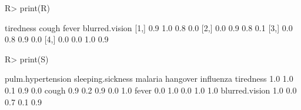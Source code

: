 \begin{Schunk}
% --begin: "comp.data"
\begin{Sinput}
R> print(R)
\end{Sinput}
\begin{Soutput}
     tiredness cough fever blurred.vision
[1,]       0.9   1.0   0.8            0.0
[2,]       0.0   0.9   0.8            0.1
[3,]       0.0   0.8   0.9            0.0
[4,]       0.0   0.0   1.0            0.9
\end{Soutput}
\begin{Sinput}
R> print(S)
\end{Sinput}
\begin{Soutput}
               pulm.hypertension sleeping.sickness malaria hangover influenza
tiredness                    1.0               1.0     0.1      0.9       0.0
cough                        0.9               0.2     0.9      0.0       1.0
fever                        0.0               1.0     0.0      1.0       1.0
blurred.vision               1.0               0.0     0.7      0.1       0.9
\end{Soutput}
%
% --end: "comp.data"
\end{Schunk}
